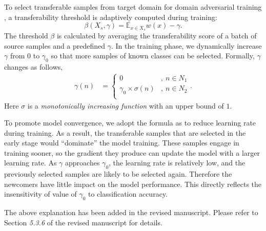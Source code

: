 To select transferable samples from target domain for domain adversarial training \cite{DomainAdversrialNetwork,ADDA,OpensetDA-bp}, a transferability threshold is adaptively computed during training:
\begin{equation}
    \label{eq: transferability thresholded}
    \beta(X_s, \gamma) = \mathbb{E}_{x \in X_s} w(x) - \gamma.
\end{equation}
The threshold $\beta$ is calculated by averaging the transferability score of a batch of source samples and a predefined $\gamma$.
In the training phase, we dynamically increase $\gamma$ from $0$ to $\gamma_0$ so that more samples of known classes can be selected.
Formally, $\gamma$ changes as follows,
\begin{equation}
    \label{eq: dynamic tolerable range}
    \begin{split}
        \gamma(n) &=
        \begin{cases}
            0 & ,\: n \in N_1 \\
            \gamma_0 \times  \sigma(n) & ,\: n\in N_2 \\
        \end{cases}.
    \end{split}
\end{equation}
Here $\sigma$ is a \textit{monotonically increasing function} with an upper bound of $1$.

To promote model convergence, we adopt the formula as \cite{DomainAdversrialNetwork} to reduce learning rate during training.
As a result, the transferable samples that are selected in the early stage would ``dominate'' the model training.
These samples engage in training sooner, so the gradient they produce can update the model with a larger learning rate.
As $\gamma$ approaches $\gamma_0$, the learning rate is relatively low, and the previously selected samples are likely to be selected again.
Therefore the newcomers have little impact on the model performance.
This directly reflects the insensitivity of value of $\gamma_0$ to classification accuracy.

The above explanation has been added in the revised manuscript.
Please refer to Section \textit{5.3.6} of the revised manuscript for details.

\renewcommand\thesection{\arabic{section}}
\setcounter{section}{0}

